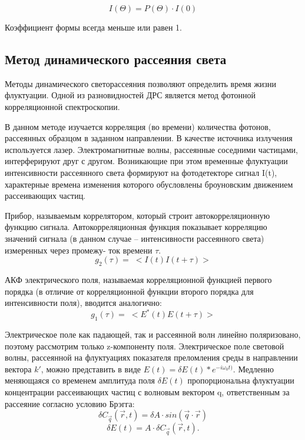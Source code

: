 \documentclass{article}
\begin{document}
\[I(\Theta) = P(\Theta) · I(0) \]

Коэффициент формы всегда меньше или равен 1.
\subsection{Метод динамического рассеяния света}\;
\par Методы динамического светорассеяния
позволяют определить время жизни флуктуации. Одной из разновидностей ДРС является метод фотонной корреляционной спектроскопии.

В данном методе изучается корреляция (во времени) количества фотонов,
рассеянных образцом в заданном направлении. В качестве источника излучения
используется лазер. Электромагнитные волны, рассеянные соседними частицами, интерферируют друг с другом. Возникающие при этом временные флуктуации интенсивности рассеянного света формируют на фотодетекторе сигнал I(t), характерные времена изменения которого обусловлены броуновским движением рассеивающих частиц. 


Прибор, называемым коррелятором, который строит автокорреляционную функцию сигнала. Автокорреляционная функция показывает корреляцию значений сигнала (в
данном случае – интенсивности рассеянного света) измеренных через промежу-
ток времени $\tau$.
\begin{equation}
    g_2(\tau) = \; <I(t)I(t+\tau)>
\end{equation}

АКФ электрического поля, называемая корреляционной функцией первого
порядка (в отличие от корреляционной функции второго порядка для
интенсивности поля), вводится аналогично:
\begin{equation}
    g_1(\tau) = \;<E^*(t)E(t+\tau)>
\end{equation}

Электрическое поле как падающей, так и рассеянной волн линейно поляризовано, поэтому рассмотрим только z-компоненту поля. Электрическое поле световой волны, рассеянной на флуктуациях показателя преломления среды в направлении вектора $k'$, можно представить в виде $E(t) = \delta E(t)*e^{-i\omega_0 t)}$.
Медленно меняющаяся со временем амплитуда поля $ \delta E(t)$ пропорциональна флуктуации концентрации рассеивающих частиц с волновым вектором q, ответственным за рассеяние согласно условию Брэгга:
 \begin{equation}
     \delta C_{\Vec{q}}(\Vec{r}, t) = \delta A \cdot sin(\Vec{q} \cdot \Vec{r})
 \end{equation}
 \begin{equation}
     \delta E(t)  = A \cdot \delta C_{\Vec{q}}(\Vec{r}, t).
 \end{equation}
\end{document}
